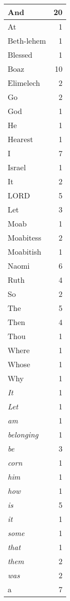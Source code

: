 \begin{center}
\begin{longtable}{l|r}
\hline \hline
\endlastfoot
And & 20 \\ \hline
At & 1 \\ \hline
Beth-lehem & 1 \\ \hline
Blessed & 1 \\ \hline
Boaz & 10 \\ \hline
Elimelech & 2 \\ \hline
Go & 2 \\ \hline
God & 1 \\ \hline
He & 1 \\ \hline
Hearest & 1 \\ \hline
I & 7 \\ \hline
Israel & 1 \\ \hline
It & 2 \\ \hline
LORD & 5 \\ \hline
Let & 3 \\ \hline
Moab & 1 \\ \hline
Moabitess & 2 \\ \hline
Moabitish & 1 \\ \hline
Naomi & 6 \\ \hline
Ruth & 4 \\ \hline
So & 2 \\ \hline
The & 5 \\ \hline
Then & 4 \\ \hline
Thou & 1 \\ \hline
Where & 1 \\ \hline
Whose & 1 \\ \hline
Why & 1 \\ \hline
\emph{It} & 1 \\ \hline
\emph{Let} & 1 \\ \hline
\emph{am} & 1 \\ \hline
\emph{belonging} & 1 \\ \hline
\emph{be} & 3 \\ \hline
\emph{corn} & 1 \\ \hline
\emph{him} & 1 \\ \hline
\emph{how} & 1 \\ \hline
\emph{is} & 5 \\ \hline
\emph{it} & 1 \\ \hline
\emph{some} & 1 \\ \hline
\emph{that} & 1 \\ \hline
\emph{them} & 2 \\ \hline
\emph{was} & 2 \\ \hline
a & 7 \\ \hline

\end{longtable}
\end{center}
